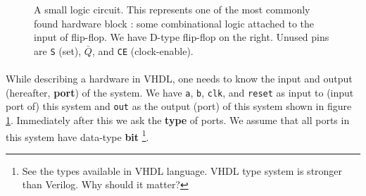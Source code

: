 \documentclass[a4paper,10pt]{article}
\begin{document}
  \begin{figure}[h]
    
    \begin{center}
    \end{center}

    \caption{A small logic circuit. This represents one of the most commonly
    found hardware block : some combinational logic attached to the input of
    flip-flop.  We have D-type flip-flop on the right. Unused pins are
    \texttt{S} (set), $\bar{Q}$, and \texttt{CE} (clock-enable).}
 
    \label{fig:circuit}
 
  \end{figure}

\paragraph{}

  While describing a hardware in VHDL, one needs to know the input and output
  (hereafter, \textbf{port}) of the system. We have \texttt{a}, \texttt{b},
  \texttt{clk}, and \texttt{reset} as input to (input port of) this system and
  \texttt{out} as the output (port) of this system shown in figure
  \ref{fig:circuit}. Immediately after this we ask the \textbf{type} of ports.
  We assume that all ports in this system have data-type \textbf{bit}
  \footnote{See the types available in VHDL language. VHDL type system is
  stronger than Verilog. Why should it matter?}.
\end{document}
